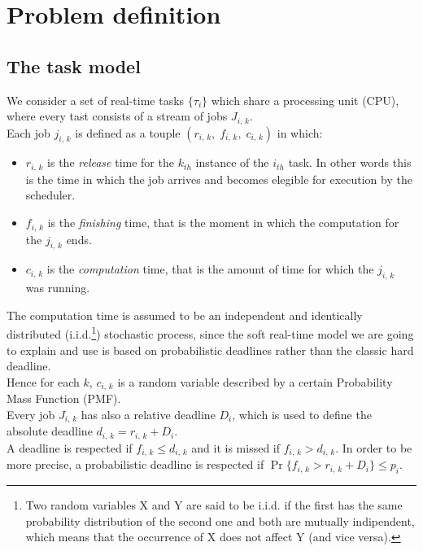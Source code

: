 \chapter{Problem definition}\label{chp:model}


\section{The task model}
We consider a set of real-time tasks \( \{\tau_{i}\} \) which share a processing unit (CPU), where every tast consists of a stream of jobs \( J_{i,\,k} \).\\
Each job \( j_{i,\,k} \) is defined as a touple \( \left(r_{i,\,k}, \;f_{i,\,k}, \;c_{i,\,k}\right) \) in which:
\begin{itemize}
  \item \( r_{i,\,k} \) is the \emph{release} time for the \( k_{th} \) instance of the \( i_{th} \) task. In other words this is the time in which the job arrives and becomes elegible for execution by the scheduler.
  \item \( f_{i,\,k} \) is the \emph{finishing} time, that is the moment in which the computation for the \( j_{i,\,k} \) ends.
  \item \( c_{i,\,k} \) is the \emph{computation} time, that is the amount of time for which the \( j_{i,\,k} \) was running.
\end{itemize} 

The computation time is assumed to be an independent and identically distributed (i.i.d.\footnote{Two random variables X and Y are said to be i.i.d. if the first has the same probability distribution of the second one and both are mutually indipendent, which means that the occurrence of X does not affect Y (and vice versa).}) stochastic process, since the soft real-time model we are going to explain and use is based on probabilistic deadlines rather than the classic hard deadline.\\
Hence for each \( k \), \( c_{i,\,k} \) is a random variable described by a certain Probability Mass Function (PMF).\\
Every job \( J_{i,\,k} \) has also a relative deadline \( D_{i} \), which is used to define the absolute deadline \( d_{i,\,k} = r_{i,\,k} + D_{i} \). \\
A deadline is respected if \( f_{i,\,k} \leq d_{i,\,k} \) and it is missed if \( f_{i,\,k} > d_{i,\,k} \). In order to be more precise, a probabilistic deadline is respected if \( \Pr\{f_{i,\,k} > r_{i,\,k} + D_{i} \} \leq p_{i} \).

